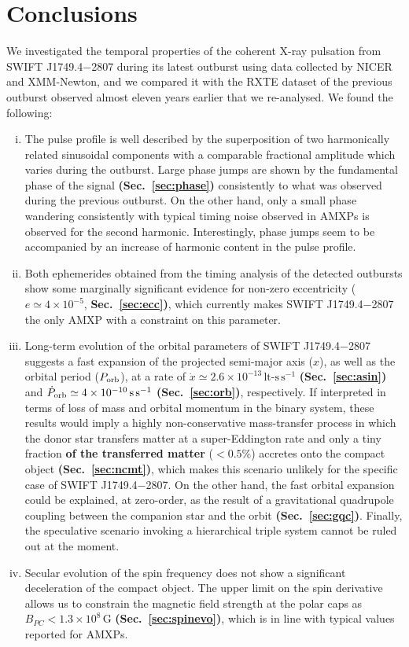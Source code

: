 \documentclass[fleqn,usenatbib]{mnras}
\newcommand{\swiftj}{SWIFT J1749.4$-$2807}
\newcommand{\nicer}{NICER}
\newcommand{\xmm}{XMM-Newton}
\newcommand{\rxte}{RXTE}
\begin{document}
\section{Conclusions}
We investigated the temporal properties of the coherent X-ray pulsation from \swiftj{} during its latest outburst using data collected by \nicer{} and \xmm{}, and we compared it with the \rxte{} dataset of the previous outburst observed almost eleven years earlier that we re-analysed. We found the following:

\begin{enumerate}[i)]
  \item The pulse profile is well described by the superposition of two harmonically related sinusoidal components with a comparable fractional amplitude which varies during the outburst. Large phase jumps are shown by the fundamental phase of the signal \textbf{(Sec.~\ref{sec:phase})} consistently to what was observed during the previous outburst. On the other hand, only a small phase wandering consistently with typical timing noise observed in AMXPs is observed for the second harmonic. Interestingly, phase jumps seem to be accompanied by an increase of harmonic content in the pulse profile. 
  \item Both ephemerides obtained from the timing analysis of the detected outbursts show some marginally significant evidence for non-zero eccentricity ($e\simeq4\times 10^{-5}$, \textbf{Sec.~\ref{sec:ecc})}, which currently makes \swiftj{} the only AMXP with a constraint on this parameter.   
  \item Long-term evolution of the orbital parameters of \swiftj{} suggests a fast expansion of the projected semi-major axis ($x$), as well as the orbital period ($P_{\rm orb}$), at a rate of $\dot{x}\simeq 2.6\times 10^{-13}\,\text{lt-s}\,\text{s}^{-1}$ \textbf{(Sec.~\ref{sec:asin})} and $\dot{P}_{\rm orb}\simeq 4 \times 10^{-10}\,\text{s}\,\text{s}^{-1}$ \textbf{(Sec.~\ref{sec:orb})}, respectively. If interpreted in terms of loss of mass and orbital momentum in the binary system, these results would imply a highly non-conservative mass-transfer process in which the donor star transfers matter at a super-Eddington rate and only a tiny fraction \textbf{of the transferred matter} ($< 0.5\%$) accretes onto the compact object \textbf{(Sec.~\ref{sec:ncmt})}, which makes this scenario unlikely for the specific case of \swiftj{}. On the other hand, the fast orbital expansion could be explained, at zero-order, as the result of a gravitational quadrupole coupling between the companion star and the orbit \textbf{(Sec.~\ref{sec:gqc})}. Finally, the speculative scenario invoking a hierarchical triple system cannot be ruled out at the moment.  
  \item Secular evolution of the spin frequency does not show a significant deceleration of the compact object. The upper limit on the spin derivative allows us to constrain the magnetic field strength at the polar caps as $B_{PC}<1.3\times 10^{8}\,\text{G}$ \textbf{(Sec.~\ref{sec:spinevo})}, which is in line with typical values reported for AMXPs.  
\end{enumerate}
\end{document}
